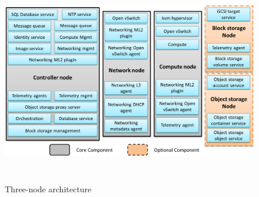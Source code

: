     \begin{figure}[h]
        \centering
        \includegraphics[width=15cm,height=9cm]{images/three_node_arch2.png}
        \caption{Three-node architecture}
    \end{figure}
    
